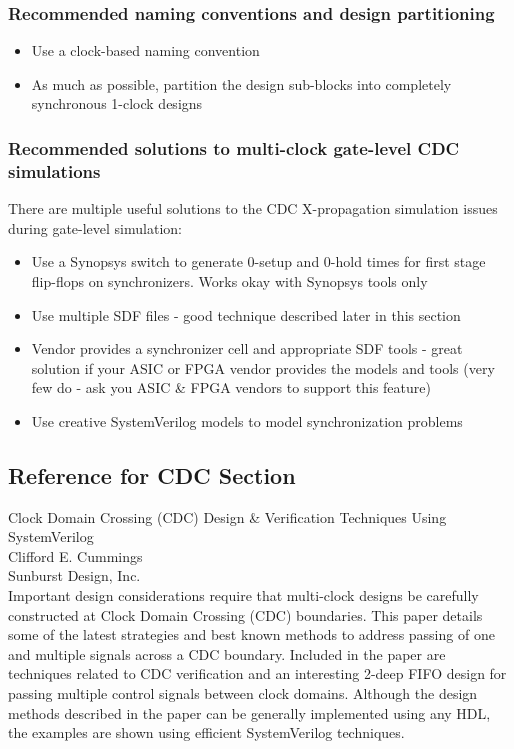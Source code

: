 \subsubsection{Recommended naming conventions and design partitioning}
\begin{itemize}
	\item Use a clock-based naming convention 
	\item As much as possible, partition the design sub-blocks into completely synchronous 1-clock designs
\end{itemize}



\subsubsection{Recommended solutions to multi-clock gate-level CDC simulations}
There are multiple useful solutions to the CDC X-propagation simulation issues during gate-level
simulation:
\begin{itemize}
	\item Use a Synopsys switch to generate 0-setup and 0-hold times for first stage flip-flops on synchronizers. Works okay with Synopsys tools only
	\item Use multiple SDF files - good technique described later in this section
	\item Vendor provides a synchronizer cell and appropriate SDF tools - great solution if your ASIC or FPGA vendor provides the models and tools (very few do - ask you ASIC \& FPGA vendors to support this feature)
	\item Use creative SystemVerilog models to model synchronization problems
\end{itemize}

\subsection{Reference for CDC Section}
Clock Domain Crossing (CDC) Design \& Verification Techniques Using SystemVerilog\\
Clifford E. Cummings\\
Sunburst Design, Inc.\\
Important design considerations require that multi-clock designs be carefully constructed at
Clock Domain Crossing (CDC) boundaries. This paper details some of the latest strategies and
best known methods to address passing of one and multiple signals across a CDC boundary.
Included in the paper are techniques related to CDC verification and an interesting 2-deep FIFO
design for passing multiple control signals between clock domains. Although the design methods
described in the paper can be generally implemented using any HDL, the examples are shown
using efficient SystemVerilog techniques.

